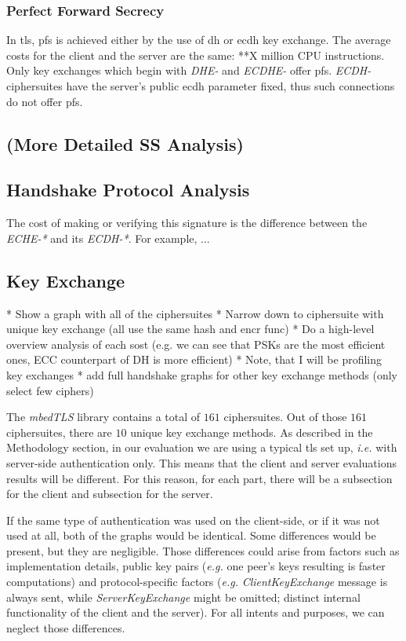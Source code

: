 \documentclass{llncs}
\begin{document}
\subsubsection{Perfect Forward Secrecy}

In \gls{tls}, \gls{pfs} is achieved either by the use of \gls{dh} or \gls{ecdh} key exchange. The average costs for the
client and the server are the same: **X million CPU instructions. Only key exchanges which begin with \textit{DHE-} and
\textit{ECDHE-} offer \gls{pfs}. \textit{ECDH-} ciphersuites have the server's public \gls{ecdh} parameter fixed, thus
such connections do not offer \gls{pfs}.

\subsection{(More Detailed SS Analysis)}

\subsection{Handshake Protocol Analysis}

The cost of making or verifying this signature is the difference between the \textit{ECHE-*} and its \textit{ECDH-*}.
For example, ...


\subsection{Key Exchange} 
 * Show a graph with all of the ciphersuites
* Narrow down to ciphersuite with unique key exchange (all use the same hash and encr func)
* Do a high-level overview analysis of each sost (e.g. we can see that PSKs are the most efficient ones,
ECC counterpart of DH is more efficient)
* Note, that  I will be profiling key exchanges
* add full handshake graphs for other key exchange methods (only select few ciphers)

The \textit{mbedTLS} library contains a total of $161$ ciphersuites. Out of those $161$ ciphersuites, there are
$10$ unique key exchange methods. As described in the Methodology section, in our evaluation we are using a typical \gls{tls} set up,
\textit{i.e.} with server-side authentication only. This means that the client and server evaluations results will be different.
For this reason, for each part, there will be a subsection for the client and subsection for the server. 

If the same type of authentication
was used on the client-side, or if it was not used at all, both of the graphs would be identical. Some differences would be present,
but they are negligible. Those differences could arise from factors such as implementation details, public key pairs (\textit{e.g.}
one peer's keys resulting is faster computations) and protocol-specific factors (\textit{e.g.} \textit{ClientKeyExchange}
message is always sent, while \textit{ServerKeyExchange} might be omitted; distinct internal functionality of the client 
and the server). For all intents and purposes, we can neglect those differences.
\end{document}
